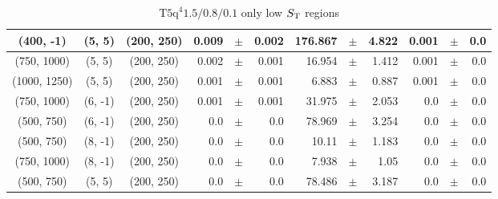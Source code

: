 \documentclass[12pt]{paper}
\newcommand{\TFiveqqqqHL}{\ensuremath{\textrm{T5q}^{4} 1.5/0.8/0.1}\xspace}
\newcommand{\ST}{\ensuremath{S_{\rm T}}\xspace}
\begin{document}
\begin{table}[ht]
\begin{center}
{\begin{tabular}{|c|c|c|rrr|rrr|rrr|}
(400, -1)&(5, 5)&(200, 250)&0.009&$\pm$&0.002&176.867&$\pm$&4.822&0.001&$\pm$&0.0\\\hline
(750, 1000)&(5, 5)&(200, 250)&0.002&$\pm$&0.001&16.954&$\pm$&1.412&0.001&$\pm$&0.0\\\hline
(1000, 1250)&(5, 5)&(200, 250)&0.001&$\pm$&0.001&6.883&$\pm$&0.887&0.001&$\pm$&0.0\\\hline
(750, 1000)&(6, -1)&(200, 250)&0.001&$\pm$&0.001&31.975&$\pm$&2.053&0.0&$\pm$&0.0\\\hline
(500, 750)&(6, -1)&(200, 250)&0.0&$\pm$&0.0&78.969&$\pm$&3.254&0.0&$\pm$&0.0\\\hline
(500, 750)&(8, -1)&(200, 250)&0.0&$\pm$&0.0&10.11&$\pm$&1.183&0.0&$\pm$&0.0\\\hline
(750, 1000)&(8, -1)&(200, 250)&0.0&$\pm$&0.0&7.938&$\pm$&1.05&0.0&$\pm$&0.0\\\hline
(500, 750)&(5, 5)&(200, 250)&0.0&$\pm$&0.0&78.486&$\pm$&3.187&0.0&$\pm$&0.0\\\hline
\end{tabular}}\end{center}\caption{\TFiveqqqqHL only low \ST regions}\end{table}
\end{document}
